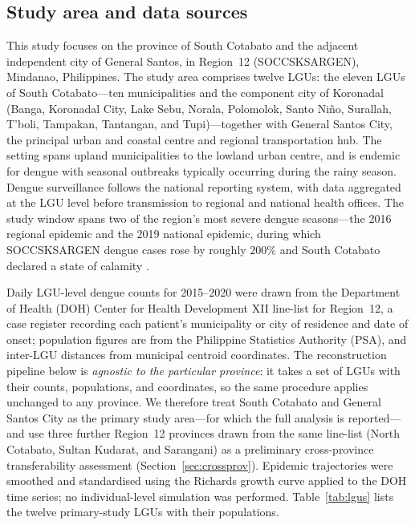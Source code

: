 \documentclass[a4paper,11pt]{article}
\begin{document}
\subsection{Study area and data sources}
This study focuses on the province of South Cotabato and the adjacent independent
city of General Santos, in Region~12 (SOCCSKSARGEN), Mindanao, Philippines. The
study area comprises twelve LGUs: the eleven LGUs of South Cotabato---ten
municipalities and the component city of Koronadal (Banga, Koronadal City, Lake
Sebu, Norala, Polomolok, Santo Ni\~{n}o, Surallah, T'boli, Tampakan, Tantangan,
and Tupi)---together with General Santos City, the principal urban and coastal
centre and regional transportation hub. The
setting spans upland municipalities to the lowland urban centre, and is endemic
for dengue with seasonal outbreaks typically occurring during the rainy season.
Dengue surveillance follows the national reporting system, with data aggregated
at the LGU level before transmission to regional and national health offices. The
study window spans two of the region's most severe dengue seasons---the 2016
regional epidemic and the 2019 national epidemic, during which SOCCSKSARGEN dengue
cases rose by roughly $200\%$ and South Cotabato declared a state of calamity
\cite{DOH2019epi,DOH12_2019}.

Daily LGU-level dengue counts for 2015--2020 were drawn from the Department of
Health (DOH) Center for Health Development XII line-list for Region~12, a case
register recording each patient's municipality or city of residence and date of
onset; population figures are from the Philippine Statistics Authority (PSA), and
inter-LGU distances from municipal centroid coordinates. The reconstruction
pipeline below is \emph{agnostic to the particular province}: it takes a set of
LGUs with their counts, populations, and coordinates, so the same procedure applies
unchanged to any province. We therefore treat South Cotabato and General Santos
City as the primary study area---for which the full analysis is reported---and use
three further Region~12 provinces drawn from the same line-list (North Cotabato,
Sultan Kudarat, and Sarangani) as a preliminary cross-province transferability
assessment (Section~\ref{sec:crossprov}). Epidemic trajectories were smoothed and standardised
using the Richards growth curve \cite{Richards1959} applied to the DOH time series;
no individual-level simulation was performed. Table~\ref{tab:lgus} lists the twelve
primary-study LGUs with their populations.
\end{document}
